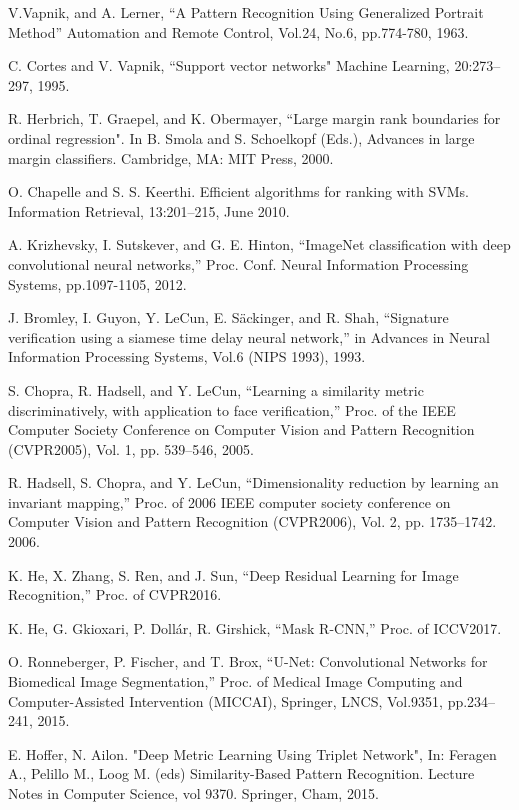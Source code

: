 \documentclass[twocolumn,10pt]{article}
\begin{document}
\begin{thebibliography}{4}

V.Vapnik,  and A. Lerner, ``A Pattern Recognition Using Generalized Portrait Method''  Automation and Remote Control, Vol.24, No.6, pp.774-780, 1963. 

C. Cortes and V. Vapnik, 
``Support vector networks" 
Machine Learning, 20:273–297, 1995.

R. Herbrich,  T. Graepel, and K. Obermayer, 
``Large margin rank boundaries for ordinal regression". 
In B. Smola and S. Schoelkopf (Eds.), Advances in large margin classifiers. Cambridge, MA: MIT Press, 2000.

O. Chapelle and S. S. Keerthi.  Efficient algorithms for ranking with SVMs. Information Retrieval, 13:201–215, June 2010.

A. Krizhevsky, I. Sutskever, and G. E. Hinton,
``ImageNet classification with deep convolutional neural networks,''
Proc. Conf. Neural Information Processing Systems, pp.1097-1105, 2012.

J. Bromley, I. Guyon, Y. LeCun, E. S\"ackinger, and R. Shah, 
``Signature verification using a siamese time delay neural network,''
in {Advances in Neural Information Processing Systems}, Vol.6 (NIPS 1993), 1993.

S. Chopra,  R. Hadsell, and Y. LeCun,
``Learning a similarity metric discriminatively, with application to face verification,'' 
Proc. of the IEEE Computer Society Conference on Computer Vision and Pattern Recognition (CVPR2005), Vol. 1, pp. 539–546, 2005.

R. Hadsell, S. Chopra, and Y. LeCun, 
``Dimensionality reduction by learning an invariant mapping,''
Proc. of 2006 IEEE computer society conference on Computer Vision and Pattern Recognition (CVPR2006), Vol. 2, pp. 1735–1742. 2006.


K. He, X. Zhang, S. Ren, and J. Sun, ``Deep Residual Learning for Image Recognition,'' Proc. of CVPR2016.

K. He, G. Gkioxari, P. Dollár, R. Girshick, ``Mask R-CNN,'' Proc. of ICCV2017.

O. Ronneberger, P. Fischer, and T. Brox, ``U-Net: Convolutional Networks for Biomedical Image Segmentation,'' Proc. of Medical Image Computing and Computer-Assisted Intervention (MICCAI), Springer, LNCS, Vol.9351, pp.234--241, 2015.

E. Hoffer, N. Ailon. 
"Deep Metric Learning Using Triplet Network",
In: Feragen A., Pelillo M., Loog M. (eds) Similarity-Based Pattern Recognition. Lecture Notes in Computer Science, vol 9370. Springer, Cham, 2015.
\end{thebibliography}
\end{document}
